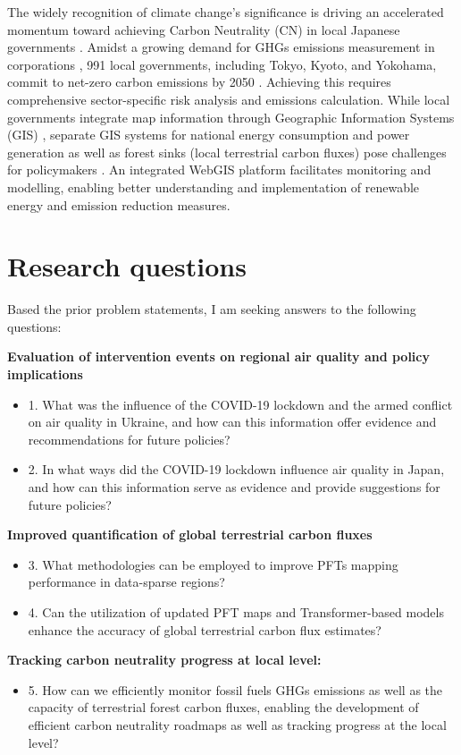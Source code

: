 The widely recognition of climate change's significance \citep{primack2009impact, watanabe2009general, ogawa2013ecological, shibuya2016effect} is driving an accelerated momentum toward achieving Carbon Neutrality (CN) in local Japanese governments \citep{nakazawa2023net}. Amidst a growing demand for GHGs emissions measurement in corporations \citep{kauffmann2012corporate}, 991 local governments, including Tokyo, Kyoto, and Yokohama, commit to net-zero carbon emissions by 2050 \citep{zerocarboncities}. Achieving this requires comprehensive sector-specific risk analysis and emissions calculation. While local governments integrate map information through Geographic Information Systems (GIS) \citep{nikkei}, separate GIS systems for national energy consumption and power generation as well as forest sinks (local terrestrial carbon fluxes) pose challenges for policymakers \citep{Toshihiko, kitamoto, nlftp}. An integrated WebGIS platform facilitates monitoring and modelling, enabling better understanding and implementation of renewable energy and emission reduction measures. \par
\section{Research questions}
Based the prior problem statements, I am seeking answers to the following questions:

\textbf{Evaluation of intervention events on regional air quality and policy implications}
\begin{itemize}
    \item 1. What was the influence of the COVID-19 lockdown and the armed conflict on air quality in Ukraine, and how can this information offer evidence and recommendations for future policies?
    \item 2. In what ways did the COVID-19 lockdown influence air quality in Japan, and how can this information serve as evidence and provide suggestions for future policies?
\end{itemize}

\textbf{Improved quantification of global terrestrial carbon fluxes}
\begin{itemize}
    \item 3. What methodologies can be employed to improve PFTs mapping performance in data-sparse regions?
    \item 4. Can the utilization of updated PFT maps and Transformer-based models enhance the accuracy of global terrestrial carbon flux estimates?
\end{itemize}
\textbf{Tracking carbon neutrality progress at local level:}
\begin{itemize}
    \item 5. How can we efficiently monitor fossil fuels GHGs emissions as well as the capacity of terrestrial forest carbon fluxes, enabling the development of efficient carbon neutrality roadmaps as well as tracking progress at the local level?
\end{itemize}

